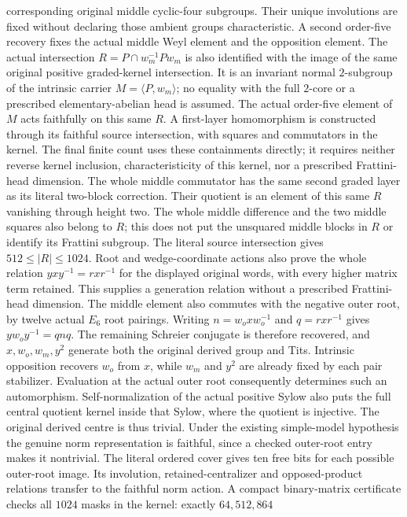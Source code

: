 corresponding original middle cyclic-four subgroups. Their unique
involutions are fixed without declaring those ambient groups
characteristic. A second order-five recovery fixes the actual middle
Weyl element and the opposition element. The actual intersection
$R=P\cap w_m^{-1}Pw_m$ is also identified with the image of the same
original positive graded-kernel intersection. It is an invariant normal
$2$-subgroup of the intrinsic carrier $M=\langle P,w_m\rangle$;
no equality with the full $2$-core or a prescribed elementary-abelian
head is assumed. The actual order-five element of $M$ acts faithfully
on this same $R$. A first-layer homomorphism is constructed through its
faithful source intersection, with squares and commutators in the
kernel. The final finite count uses these containments directly; it
requires neither reverse kernel inclusion, characteristicity of this
kernel, nor a prescribed Frattini-head dimension.
The whole middle commutator has the same second graded layer as its
literal two-block correction. Their quotient is an element of this
same $R$ vanishing through height two. The whole middle difference
and the two middle squares also belong to $R$; this does not put the
unsquared middle blocks in $R$ or identify its Frattini subgroup.
The literal source intersection gives $512\leq |R|\leq1024$.
Root and wedge-coordinate actions also prove the whole relation
$yxy^{-1}=rxr^{-1}$ for the displayed original words, with every higher
matrix term retained. This supplies a generation relation without a
prescribed Frattini-head dimension.
The middle element also commutes with the negative outer root, by
twelve actual $E_6$ root pairings. Writing
$n=w_oxw_o^{-1}$ and $q=rxr^{-1}$ gives
$yw_oy^{-1}=qnq$. The remaining Schreier conjugate is therefore
recovered, and $x,w_o,w_m,y^2$ generate both the original derived
group and Tits. Intrinsic opposition recovers $w_o$ from $x$, while
$w_m$ and $y^2$ are already fixed by each pair stabilizer. Evaluation
at the actual outer root consequently determines such an automorphism.
Self-normalization of the actual positive Sylow also puts the full
central quotient kernel inside that Sylow, where the quotient is
injective. The original derived centre is thus trivial. Under the
existing simple-model hypothesis the genuine norm representation is
faithful, since a checked outer-root entry makes it nontrivial.
The literal ordered cover gives ten free bits for each possible
outer-root image. Its involution, retained-centralizer and opposed-product
relations transfer to the faithful norm action. A compact binary-matrix
certificate checks all $1024$ masks in the kernel: exactly $64,512,864$
